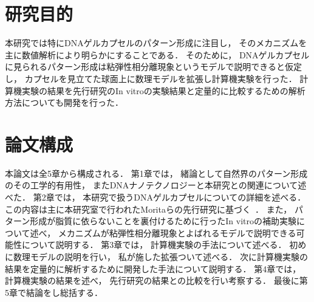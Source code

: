 \section{研究目的}
本研究では特にDNAゲルカプセルのパターン形成に注目し，
そのメカニズムを主に数値解析により明らかにすることである．
そのために，
DNAゲルカプセルに見られるパターン形成は粘弾性相分離現象というモデルで説明できると仮定し，
カプセルを見立てた球面上に数理モデルを拡張し計算機実験を行った．
計算機実験の結果を先行研究のIn vitroの実験結果と定量的に比較するための解析方法についても開発を行った．

\section{論文構成}
本論文は全5章から構成される．
第1章では，
緒論として自然界のパターン形成のその工学的有用性，
またDNAナノテクノロジーと本研究との関連について述べた．
第2章では，
本研究で扱うDNAゲルカプセルについての詳細を述べる．
この内容は主に本研究室で行われたMoritaらの先行研究に基づく~\cite{morita2017formation}．
また，
パターン形成が脂質に依らないことを裏付けるために行ったIn vitroの補助実験について述べ，
メカニズムが粘弾性相分離現象とよばれるモデルで説明できる可能性について説明する．
第3章では，
計算機実験の手法について述べる．
初めに数理モデルの説明を行い，
私が施した拡張ついて述べる．
次に計算機実験の結果を定量的に解析するために開発した手法について説明する．
第4章では，
計算機実験の結果を述べ，
先行研究の結果との比較を行い考察する．
最後に第5章で結論をし総括する．
